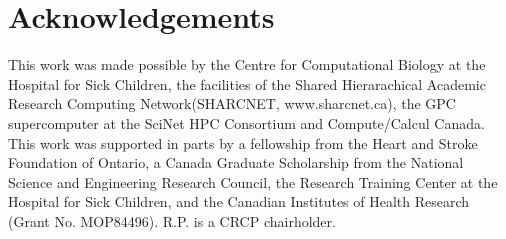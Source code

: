 \section*{Acknowledgements}
This work was made possible by the Centre for Computational Biology at the Hospital for Sick Children, the facilities of the Shared Hierarachical Academic Research Computing Network(SHARCNET, www.sharcnet.ca), the GPC supercomputer at the SciNet HPC Consortium and Compute/Calcul Canada. This work was supported in parts by a fellowship from the Heart and Stroke Foundation of Ontario, a Canada Graduate Scholarship from the National Science and Engineering Research Council, the Research Training Center at the Hospital for Sick Children, and the Canadian Institutes of Health Research (Grant No. MOP84496). R.P. is a CRCP chairholder.

\begin{singlespace}


\end{singlespace}
